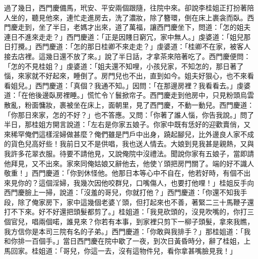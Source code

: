 過了幾日，西門慶備馬，玳安、平安兩個跟隨，往院中來。卻說李桂姐正打扮著陪人坐的，聽見他來，連忙走進房去，洗了濃妝，除了簪環，倒在床上裹衾而臥。西門慶走到，坐了半日，老媽才出來，道了萬福，讓西門慶坐下，問道：「怎的姐夫連日不進來走走？」西門慶道：「正是因賤日窮冗，家中無人。」虔婆道：「姐兒那日打攪。」西門慶道：「怎的那日桂卿不來走走？」虔婆道：「桂卿不在家，被客人接去店裡。這幾日還不放了來。」說了半日話，才拿茶來陪著吃了。西門慶便問：「怎的不見桂姐？」虔婆道：「姐夫還不知哩，小孩兒家，不知怎的，那日著了惱，來家就不好起來，睡倒了。房門兒也不出，直到如今。姐夫好狠心，也不來看看姐兒。」西門慶道：「真個？我通不知。」因問：「在那邊房裡？我看看去。」虔婆道：「在他後邊臥房裡睡。」慌忙令丫鬟掀帘子。西門慶走到他房中，只見粉頭烏雲散亂，粉面慵妝，裹被坐在床上，面朝里，見了西門慶，不動一動兒。西門慶道：「你那日來家，怎的不好？」也不答應。又問：「你著了誰人惱，你告我說。」問了半日，那桂姐方開言說道：「左右是你家五娘子。你家中既有恁好的迎歡賣俏，又來稀罕俺們這樣淫婦做甚麼？俺們雖是門戶中出身，蹺起腳兒，比外邊良人家不成的貨色兒高好些！我前日又不是供唱，我也送人情去。大娘到見我甚是親熱，又與我許多花翠衣服。待要不請他見，又說俺院中沒禮法。聞說你家有五娘子，當即請他拜見，又不出來。家來同俺姑娘又辭他去，他使丫頭把房門關了。端的好不識人敬重！」西門慶道：「你到休怪他。他那日本等心中不自在，他若好時，有個不出來見你的？這個淫婦，我幾次因他咬群兒，口嘴傷人，也要打他哩！」桂姐反手向西門慶臉上一掃，說道：「沒羞的哥兒，你就打他？」西門慶道：「你還不知我手段，除了俺家房下，家中這幾個老婆丫頭，但打起來也不善，著緊二三十馬鞭子還打不下來。好不好還把頭髮都剪了。」桂姐道：「我見砍頭的，沒見吹嘴的，你打三個官兒，唱兩個喏，誰見來？你若有本事，到家裡只剪下一柳子頭髮，拿來我瞧，我方信你是本司三院有名的子弟。」西門慶道：「你敢與我排手？」那桂姐道：「我和你排一百個手。」當日西門慶在院中歇了一夜，到次日黃昏時分，辭了桂姐，上馬回家。桂姐道：「哥兒，你這一去，沒有這物件兒，看你拿甚嘴臉見我！」

